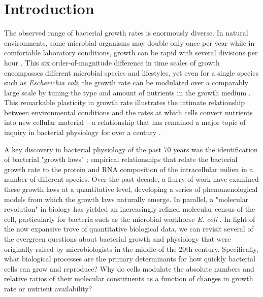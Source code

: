 
\section{Introduction}
The observed range of bacterial growth rates is enormously diverse. In natural
environments, some microbial organisms may double only once per year
\citep{mikucki2009} while in comfortable laboratory conditions, growth can be
rapid with several divisions per hour \citep{schaechter1958}. This six
order-of-magnitude difference in time scales of growth encompasses different
microbial species and lifestyles, yet even for a single species such as
\textit{Escherichia coli}, the growth rate can be modulated over a comparably
large scale by tuning the type and amount of nutrients in the growth medium
\citep{liu2005a}. This remarkable plasticity in growth rate illustrates the
intimate relationship between environmental conditions and the rates at which
cells convert nutrients into new cellular material -- a relationship that has
remained a major topic of inquiry in bacterial physiology for over a century
\citep{jun2018}.


A key discovery in bacterial physiology of the past 70 years was the
identification of bacterial "growth laws" \citep{schaechter1958}; empirical
relationships that relate the bacterial growth rate to the protein and RNA
composition of the intracellular milieu in a number of different species.
Over the past decade, a flurry of work \citep{molenaar2009, scott2010,
klumpp2014, basan2015, dai2016, erickson2017} have examined these growth laws
at a quantitative level, developing a series of phenomenological models from
which the growth laws naturally emerge. In parallel, a "molecular revolution"
in biology has yielded an increasingly refined molecular census of the cell,
particularly for bacteria such as the microbial workhorse \textit{E. coli}
\citep{schmidt2016, davidi2016a}. In light of the now expansive trove of
quantitative biological data, we can revisit several of the evergreen
questions about bacterial growth and physiology that were originally raised
by microbiologists in the middle of the 20th century. Specifically, what
biological processes are the primary determinants for how quickly bacterial
cells can grow and reproduce? Why do cells modulate the absolute numbers and
relative ratios of their molecular constituents as a function of changes in
growth rate or nutrient availability?

